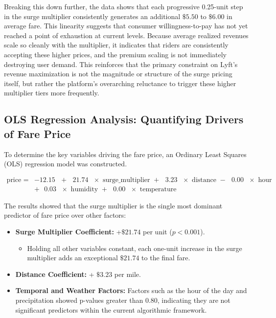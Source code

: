 \documentclass[11pt, letterpaper]{article}
\begin{document}
Breaking this down further, the data shows that each progressive 0.25-unit step in the surge multiplier consistently generates an additional $\$5.50$ to $\$6.00$ in average fare. This linearity suggests that consumer willingness-to-pay has not yet reached a point of exhaustion at current levels. Because average realized revenues scale so cleanly with the multiplier, it indicates that riders are consistently accepting these higher prices, and the premium scaling is not immediately destroying user demand. This reinforces that the primary constraint on Lyft's revenue maximization is not the magnitude or structure of the surge pricing itself, but rather the platform's overarching reluctance to trigger these higher multiplier tiers more frequently.

\subsection{OLS Regression Analysis: Quantifying Drivers of Fare Price}

To determine the key variables driving the fare price, an Ordinary Least Squares (OLS) regression model was constructed.
\begin{center}
\begin{equation}
\begin{split}
    \text{price } = &-12.15 \text{ } + \text{ } 21.74 \text{ } \times \text{ surge\_multiplier } + \text{ } 3.23 \text{ } \times \text{ distance } - \text{ } 0.00 \text{ } \times \text{ hour } \\
    &+ \text{ } 0.03 \text{ } \times \text{ humidity } + \text{ } 0.00 \text{ } \times \text{ temperature }
\end{split}
\end{equation}
\end{center}

The results showed that the surge multiplier is the single most dominant predictor of fare price over other factors:
\begin{itemize}[noitemsep]
    \item \textbf{Surge Multiplier Coefficient:} +$\$21.74$ per unit ($p < 0.001$).
    \begin{itemize}
        \item Holding all other variables constant, each one-unit increase in the surge multiplier adds an exceptional $\$21.74$ to the final fare.
    \end{itemize}
    \item \textbf{Distance Coefficient:} + $\$3.23$ per mile.
    \item \textbf{Temporal and Weather Factors:} Factors such as the hour of the day and precipitation showed p-values greater than 0.80, indicating they are not significant predictors within the current algorithmic framework.
\end{itemize}
\end{document}
